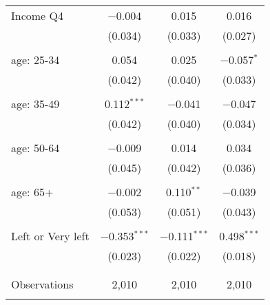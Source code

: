 \begin{tabular}{@{\extracolsep{5pt}}lccc}
 Income Q4 & $-$0.004 & 0.015 & 0.016 \\ 
  & (0.034) & (0.033) & (0.027) \\ 
  & & & \\ 
 age: 25-34 & 0.054 & 0.025 & $-$0.057$^{*}$ \\ 
  & (0.042) & (0.040) & (0.033) \\ 
  & & & \\ 
 age: 35-49 & 0.112$^{***}$ & $-$0.041 & $-$0.047 \\ 
  & (0.042) & (0.040) & (0.034) \\ 
  & & & \\ 
 age: 50-64 & $-$0.009 & 0.014 & 0.034 \\ 
  & (0.045) & (0.042) & (0.036) \\ 
  & & & \\ 
 age: 65+ & $-$0.002 & 0.110$^{**}$ & $-$0.039 \\ 
  & (0.053) & (0.051) & (0.043) \\ 
  & & & \\ 
 Left or Very left & $-$0.353$^{***}$ & $-$0.111$^{***}$ & 0.498$^{***}$ \\ 
  & (0.023) & (0.022) & (0.018) \\ 
  & & & \\ 
\hline \\[-1.8ex] 

Observations & 2,010 & 2,010 & 2,010 \\ 
\hline 
\hline \\[-1.8ex] 
\end{tabular} 